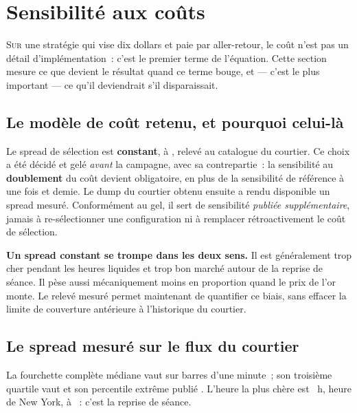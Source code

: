 \section{Sensibilité aux coûts}
\label{sec:x10_couts}

\lettrine[lines=2, findent=2pt, nindent=0pt]{S}{ur} une stratégie qui vise
dix dollars et paie \XTenSpreadUsd{} par aller-retour, le coût n'est pas un
détail d'implémentation~: c'est le premier terme de l'équation. Cette section
mesure ce que devient le résultat quand ce terme bouge, et --- c'est le plus
important --- ce qu'il deviendrait s'il disparaissait.

\subsection{Le modèle de coût retenu, et pourquoi celui-là}

Le spread de sélection est \textbf{constant}, à \XTenSpreadUsd, relevé au
catalogue du courtier. Ce choix a été décidé et gelé \emph{avant} la campagne,
avec sa contrepartie~:
la sensibilité au \textbf{doublement} du coût devient obligatoire, en plus de
la sensibilité de référence à une fois et demie. Le dump du courtier obtenu
ensuite a rendu disponible un spread mesuré. Conformément au gel, il sert de
sensibilité \emph{publiée supplémentaire}, jamais à re-sélectionner une
configuration ni à remplacer rétroactivement le coût de sélection.

\begin{warningbox}
\textbf{Un spread constant se trompe dans les deux sens.} Il est généralement
trop cher pendant les heures liquides et trop bon marché autour de la reprise
de séance. Il pèse aussi mécaniquement moins en proportion quand le prix de
l'or monte. Le relevé mesuré permet maintenant de quantifier ce biais, sans
effacer la limite de couverture antérieure à l'historique du courtier.
\end{warningbox}

\subsection{Le spread mesuré sur le flux du courtier}

La fourchette complète médiane vaut \XTenSpreadMeasuredMedian{} sur
\XTenSpreadMeasuredBars{} barres d'une minute~; son troisième quartile vaut
\XTenSpreadMeasuredPSevenFive{} et son percentile extrême publié
\XTenSpreadMeasuredPNinetyFive. L'heure la plus chère est
\XTenSpreadCostliestHour{}~h, heure de New York, à
\XTenSpreadCostliestValue~: c'est la reprise de séance.

